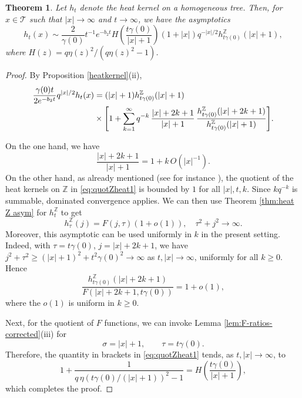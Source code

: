 \documentclass[11pt,a4paper,reqno]{amsart}
\renewcommand\mathcal{\mathscr}
\theoremstyle{plain}
\newtheorem{theorem}{Theorem}[section]
\theoremstyle{remark}
\theoremstyle{definition}
\theoremstyle{remark}
\numberwithin{equation}{section}
\begin{document}
\begin{theorem}\label{prop:heat_asymp_ell1}
		Let $h_t$ denote the heat kernel on a homogeneous tree. Then, for $x\in \mathcal{T}$ such that $|x|\to \infty$ and $t\to \infty$, we have the asymptotics
		\[
		h_t(x)\sim\frac{2}{\gamma(0)}
t^{-1}e^{-b_2t}
H\!\left(\frac{t\gamma(0)}{|x|+1}\right)
(1+|x|)q^{-|x|/2}
h_{t\gamma(0)}^{\mathbb Z}(|x|+1),\]
where $H(z)={q\eta(z)^2}/{(q\eta(z)^2-1)}$.
	\end{theorem}
	\begin{proof}
		By Proposition \ref{heatkernel}(ii), 
\begin{align}
\frac{\gamma(0)t}{2e^{-b_2t}}q^{|x|/2}h_t(x)&=
(|x|+1)h_{t\gamma(0)}^{\mathbb Z}(|x|+1) \notag \\
&\times\Bigg[
1+
\sum_{k=1}^\infty q^{-k}\,
\frac{|x|+2k+1}{|x|+1}\,
\frac{
h_{t\gamma(0)}^{\mathbb Z}(|x|+2k+1)
}{
h_{t\gamma(0)}^{\mathbb Z}(|x|+1)
}
\Bigg].
\label{eq:quotZheat1}
\end{align}

		On the one hand, we have
\[
\frac{|x|+2k+1}{|x|+1}=1+k\,O(|x|^{-1}).
\] On the other hand, as already mentioned (see for instance \cite[p.4282]{CMS}), the quotient of the heat kernels on $\mathbb{Z}$ in \eqref{eq:quotZheat1} is bounded by $1$ for all $|x|, t, k$. Since $kq^{-k}$ is summable, dominated convergence applies. 
We can then use Theorem \ref{thm:heat Z asym} for $h_t^{\mathbb{Z}}$ to get 
\[
h_\tau^{\mathbb Z}(j)=F(j,\tau)(1+o(1)), \quad \tau^2+j^2\to \infty.
\]
Moreover, this asymptotic can be used uniformly in $k$ in the present setting. Indeed, with $
\tau=t\gamma(0)$, $j=|x|+2k+1$,
we have
$j^2+\tau^2
\ge (|x|+1)^2+t^2\gamma(0)^2
\to \infty$
as $t,|x|\to\infty$, uniformly for all $k\ge0$. Hence
\[
\frac{h_{t\gamma(0)}^{\mathbb Z}(|x|+2k+1)}
{F(|x|+2k+1,t\gamma(0))}
=1+o(1),
\]
where the $o(1)$ is uniform in $k\ge0$. 

Next, for the quotient of $F$ functions,  we can invoke Lemma \ref{lem:F-ratios-corrected}(iii) for
\[
\sigma=|x|+1,
\qquad
\tau=t\gamma(0).
\]
Therefore, the quantity in brackets in \eqref{eq:quotZheat1} tends, as $t, |x|\to \infty$, to 
\[
1+\frac{1}{q\,\eta (t\gamma(0)/(|x|+1))^2-1}=
H\!\left(\frac{t\gamma(0)}{|x|+1}\right),
\]
which completes the proof.
\end{proof}
\end{document}
